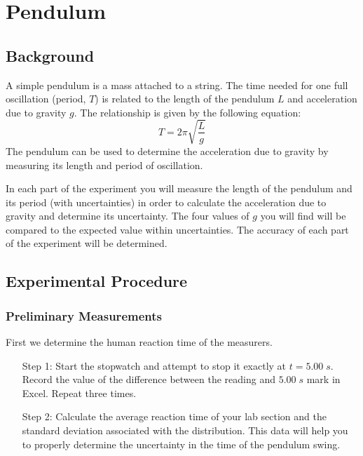 \chapter{Pendulum}

\section{Background}

A simple pendulum is a mass attached to a string. The time needed for one full oscillation (period, $T$) is related to the length of the pendulum $L$ and acceleration due to gravity $g$. The relationship is given by the following equation: \begin{equation}\label{eq:Pend1}
    T = 2\pi \sqrt{\frac{L}{g}}
\end{equation}
The pendulum can be used to determine the acceleration due to gravity by measuring its length and period of oscillation.

In each part of the experiment you will measure the length of the pendulum and its period (with uncertainties) in order to calculate the acceleration due to gravity and determine its uncertainty. The four values of $g$ you will find will be compared to the expected value within uncertainties. The accuracy of each part of the experiment will be determined.

\section{Experimental Procedure}

\subsection{Preliminary Measurements}

First we determine the human reaction time of the measurers. \begin{itemize}[leftmargin = 50pt]
    \item[Step 1:] Start the stopwatch and attempt to stop it exactly at $t = 5.00\;s$. Record the value of the difference between the reading and $5.00\;s$ mark in Excel. Repeat three times.
    \item[Step 2:] Calculate the average reaction time of your lab section and the standard deviation associated with the distribution. This data will help you to properly determine the uncertainty in the time of the pendulum swing.
\end{itemize}

